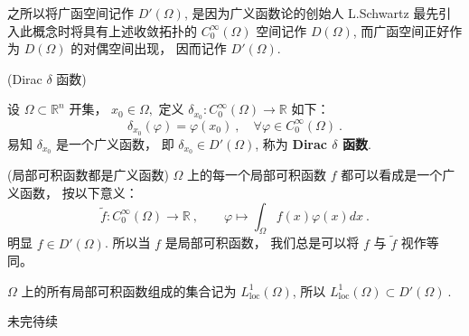 之所以将广函空间记作 $D'(\Omega)$, 是因为广义函数论的创始人 L.Schwartz 最先引入此概念时将具有上述收敛拓扑的
$C_{0}^{\infty}(\Omega)$ 空间记作 $D(\Omega)$, 而广函空间正好作为 $D(\Omega)$
的对偶空间出现， 因而记作 $D'(\Omega)$. 
\begin{example}{(Dirac $\delta$ 函数)
}

设 $\Omega\subset\mathbb{R}^{n}$ 开集， $x_{0}\in\Omega,$ 定义 $\delta_{x_{0}}:C_{0}^{\infty}(\Omega)\rightarrow\mathbb{R}$
如下： 
\[
\delta_{x_{0}}(\varphi)=\varphi(x_{0})~,\quad\forall\varphi\in C_{0}^{\infty}(\Omega)~.
\]
易知 $\delta_{x_{0}}$ 是一个广义函数， 即 $\delta_{x_{0}}\in D'(\Omega)$, 称为
\textbf{Dirac $\delta$ 函数}. 
\end{example}

\begin{example}{(局部可积函数都是广义函数)}
$\Omega$ 上的每一个局部可积函数 $f$ 都可以看成是一个广义函数， 按以下意义： 
\[
\tilde{f}:C_{0}^{\infty}(\Omega)\rightarrow\mathbb{R}~,\quad\quad\varphi\mapsto{\displaystyle \int_{\Omega}f(x)\varphi(x)dx}~.
\]
明显 $f\in D'(\Omega)$. 所以当 $f$ 是局部可积函数， 我们总是可以将 $f$ 与 $\tilde{f}$
视作等同。 

$\Omega$ 上的所有局部可积函数组成的集合记为 $L_{\mathrm{loc}}^1(\Omega)$, 所以
$L_{\mathrm{loc}}^1(\Omega)\subset D'(\Omega)~.$
\end{example}

未完待续